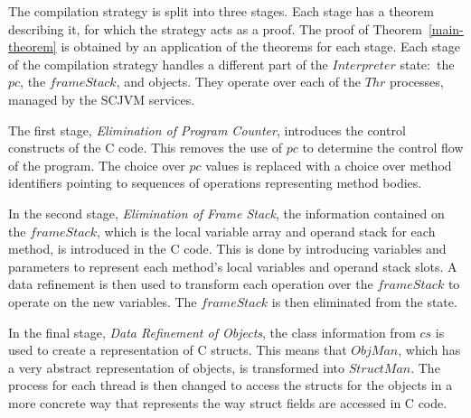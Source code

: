 The compilation strategy is split into three stages.
Each stage has a theorem describing it, for which the strategy acts as
a proof.
The proof of Theorem~\ref{main-theorem} is obtained by an application
of the theorems for each stage.
Each stage of the compilation strategy handles a different part of the
$Interpreter$ state:~the $pc$, the $frameStack$, and objects.
They operate over each of the $Thr$ processes, managed by the SCJVM
services.

The first stage, \emph{Elimination of Program Counter}, introduces the
control constructs of the C code.
This removes the use of $pc$ to determine the control flow of the
program.
The choice over $pc$ values is replaced with a choice over method
identifiers pointing to sequences of operations representing method
bodies.

In the second stage, \emph{Elimination of Frame Stack}, the
information contained on the $frameStack$, which is the local variable
array and operand stack for each method, is introduced in the C code.
This is done by introducing variables and parameters to represent each
method's local variables and operand stack slots.
A data refinement is then used to transform each operation over the
$frameStack$ to operate on the new variables.
The $frameStack$ is then eliminated from the state.

In the final stage, \emph{Data Refinement of Objects}, the class
information from $cs$ is used to create a representation of C structs.
This means that $ObjMan$, which has a very abstract representation of
objects, is transformed into $StructMan$.
The process for each thread is then changed to access the structs for
the objects in a more concrete way that represents the way struct
fields are accessed in C code.

